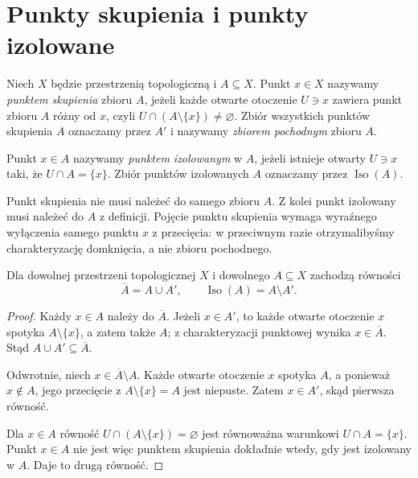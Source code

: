 \section{Punkty skupienia i punkty izolowane}
\label{sec:topog-punkty-skupienia}

\begin{definicja}
\label{def:topog-zbior-pochodny}
Niech $X$ będzie przestrzenią topologiczną i $A\subseteq X$.
Punkt $x\in X$ nazywamy \emph{punktem skupienia} zbioru $A$,
jeżeli każde otwarte otoczenie $U\ni x$ zawiera punkt
zbioru $A$ różny od $x$, czyli
$U\cap(A\setminus\{x\})\ne\varnothing$.
Zbiór wszystkich punktów skupienia $A$ oznaczamy przez
$A'$ i nazywamy \emph{zbiorem pochodnym} zbioru $A$.

Punkt $x\in A$ nazywamy \emph{punktem izolowanym} w $A$,
jeżeli istnieje otwarty $U\ni x$ taki, że
$U\cap A=\{x\}$. Zbiór punktów izolowanych $A$
oznaczamy przez $\operatorname{Iso}(A)$.
\end{definicja}

Punkt skupienia nie musi należeć do samego zbioru $A$.
Z kolei punkt izolowany musi należeć do $A$ z definicji.
Pojęcie punktu skupienia wymaga wyraźnego wyłączenia
samego punktu $x$ z przecięcia: w przeciwnym razie
otrzymalibyśmy charakteryzację domknięcia, a nie zbioru pochodnego.

\begin{twierdzenie}
\label{thm:topog-domkniecie-pochodny}
Dla dowolnej przestrzeni topologicznej $X$ i dowolnego $A\subseteq X$
zachodzą równości
\[
\overline A=A\cup A',\qquad
\operatorname{Iso}(A)=A\setminus A'.
\]
\end{twierdzenie}
\begin{proof}
Każdy $x\in A$ należy do $\overline A$.
Jeżeli $x\in A'$, to każde otwarte otoczenie $x$
spotyka $A\setminus\{x\}$, a zatem także $A$;
z charakteryzacji punktowej wynika $x\in\overline A$.
Stąd $A\cup A'\subseteq\overline A$.

Odwrotnie, niech $x\in\overline A\setminus A$.
Każde otwarte otoczenie $x$ spotyka $A$, a ponieważ
$x\notin A$, jego przecięcie z $A\setminus\{x\}=A$
jest niepuste. Zatem $x\in A'$, skąd pierwsza równość.

Dla $x\in A$ równość
$U\cap(A\setminus\{x\})=\varnothing$
jest równoważna warunkowi $U\cap A=\{x\}$.
Punkt $x\in A$ nie jest więc punktem skupienia dokładnie
wtedy, gdy jest izolowany w $A$. Daje to drugą równość.
\end{proof}

